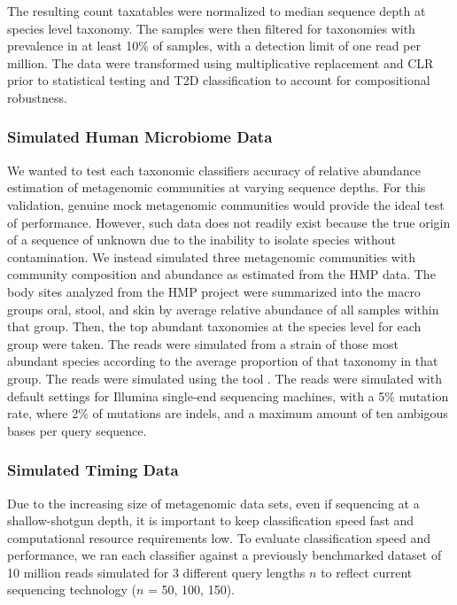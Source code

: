 The resulting count taxatables were normalized to median sequence depth at species level taxonomy. The samples were then filtered for taxonomies with prevalence in at least 10\% of samples, with a detection limit of one read per million. The data were transformed using multiplicative replacement and CLR prior to statistical testing and T2D classification to account for compositional robustness.

\subsubsection{Simulated Human Microbiome Data}

We wanted to test each taxonomic classifiers accuracy of relative abundance estimation of metagenomic communities at varying sequence depths. For this validation, genuine mock metagenomic communities would provide the ideal test of performance. However, such data does not readily exist because the true origin of a sequence of unknown due to the inability to isolate species without contamination. We instead simulated three metagenomic communities with community composition and abundance as estimated from the HMP data. The body sites analyzed from the HMP project were summarized into the macro groups oral, stool, and skin by average relative abundance of all samples within that group. Then, the top abundant taxonomies at the species level for each group were taken. The reads were simulated from a strain of those most abundant species according to the average proportion of that taxonomy in that group. The reads were simulated using the tool . The reads were simulated with default settings for Illumina single-end sequencing machines, with a 5\% mutation rate, where 2\% of mutations are indels, and a maximum amount of ten ambigous bases per query sequence.

\subsubsection{Simulated Timing Data}

Due to the increasing size of metagenomic data sets, even if sequencing at a shallow-shotgun depth, it is important to keep classification speed fast and computational resource requirements low. To evaluate classification speed and performance, we ran each classifier against a previously benchmarked dataset of 10 million reads simulated for 3 different query lengths $n$ to reflect current sequencing technology ($n$ = 50, 100, 150).

